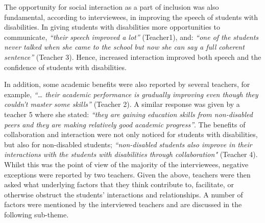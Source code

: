 \documentclass[11.5pt]{sig-alternate}
\begin{document}
\begin{large}
The opportunity for social interaction as a part of inclusion was also fundamental, according to interviewees, in improving the speech of students with disabilities. In giving students with disabilities more opportunities to communicate, \textit{“their speech improved a lot”} (Teacher1), and: \textit{“one of the students never talked when she came to the school but now she can say a full coherent sentence”} (Teacher 3). Hence, increased interaction improved both speech and the confidence of students with disabilities. 

In addition, some academic benefits were also reported by several teachers, for example, \textit{“… their academic performance is gradually improving even though they couldn't master some skills”} (Teacher 2). A similar response was given by a teacher 5 where she stated: \textit{“they are gaining education skills from non-disabled peers and they are making relatively good academic progress”}. The benefits of collaboration and interaction were not only noticed for students with disabilities, but also for non-disabled students; \textit{“non-disabled students also improve in their interactions with the students with disabilities through collaboration"} (Teacher 4). Whilst this was the point of view of the majority of the interviewees, negative exceptions were reported by two teachers. Given the above, teachers were then asked what underlying factors that they think contribute to, facilitate, or otherwise obstruct the students’ interactions and relationships. A number of factors were mentioned by the interviewed teachers and are discussed in the following sub-theme. 


\end{large}
\end{document}
